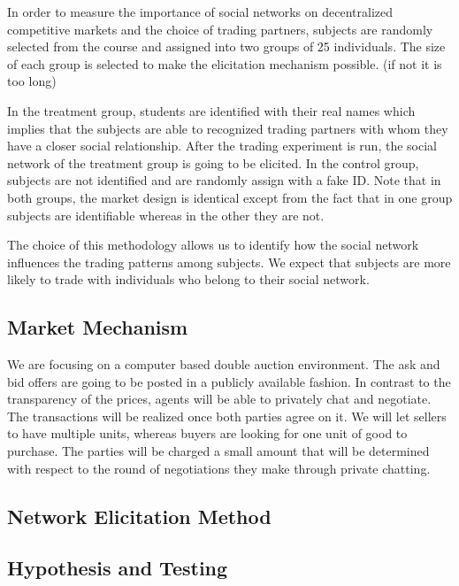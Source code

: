 \documentclass{article}
\begin{document}
In order to measure the importance of social networks on decentralized
competitive markets and the choice of trading partners, subjects are randomly
selected from the course and assigned into two groups of 25 individuals. The
size of each group is selected to make the elicitation mechanism possible. (if
not it is too long)

In the treatment group, students are identified with their real names which
implies that the subjects are able to recognized trading partners with whom they
have a closer social relationship. After the trading experiment is run, the
social network of the treatment group is going to be elicited. In the control
group, subjects are not identified and are randomly assign with a fake ID. Note
that in both groups, the market design is identical except from the fact that in
one group subjects are identifiable whereas in the other they are not.

The choice of this methodology allows us to identify how the social network
influences the trading patterns among subjects. We expect that subjects are more
likely to trade with individuals who belong to their social network.

\subsection{Market Mechanism}
We are focusing on a computer based double auction environment. The ask and bid
offers are going to be posted in a publicly available fashion. In contrast to
the transparency of the prices, agents will be able to privately chat and
negotiate. The transactions will be realized once both parties agree on it. We
will let sellers to have multiple units, whereas buyers are looking for one unit
of good to purchase. The parties will be charged a small amount that will be
determined with respect to the round of negotiations they make through private
chatting.

\subsection{Network Elicitation Method}



\subsection{Hypothesis and Testing}
\end{document}
